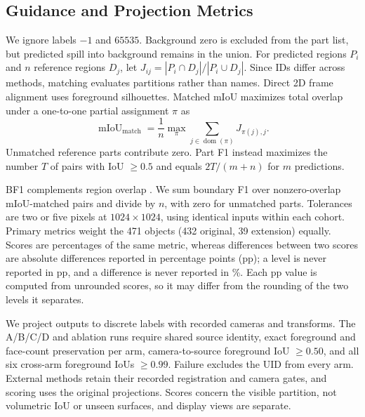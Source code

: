 \documentclass[pdflatex,sn-mathphys-ay]{sn-jnl}
\begin{document}
\subsection{Guidance and Projection Metrics}
We ignore labels $-1$ and $65535$. Background zero is excluded from the part list, but predicted spill into background remains in the union. For predicted regions $P_i$ and $n$ reference regions $D_j$, let $J_{ij}=|P_i\cap D_j|/|P_i\cup D_j|$. Since IDs differ across methods, matching evaluates partitions rather than names. Direct 2D frame alignment uses foreground silhouettes. Matched mIoU maximizes total overlap under a one-to-one partial assignment $\pi$ as
\begin{equation}
\operatorname{mIoU}_{\mathrm{match}}
=\frac1n\max_\pi\sum_{j\in\operatorname{dom}(\pi)}J_{\pi(j),j}.
\label{eq:matched}
\end{equation}
Unmatched reference parts contribute zero. Part F1 instead maximizes the number $T$ of pairs with IoU $\geq0.5$ and equals $2T/(m+n)$ for $m$ predictions.

BF1 complements region overlap \citep{cheng2021boundaryiou}. We sum boundary F1 over nonzero-overlap mIoU-matched pairs and divide by $n$, with zero for unmatched parts. Tolerances are two or five pixels at $1024\times1024$, using identical inputs within each cohort. Primary metrics weight the 471 objects (432 original, 39 extension) equally. Scores are percentages of the same metric, whereas differences between two scores are absolute differences reported in percentage points (pp); a level is never reported in pp, and a difference is never reported in \%. Each pp value is computed from unrounded scores, so it may differ from the rounding of the two levels it separates.

We project outputs to discrete labels with recorded cameras and transforms. The A/B/C/D and ablation runs require shared source identity, exact foreground and face-count preservation per arm, camera-to-source foreground IoU $\geq0.50$, and all six cross-arm foreground IoUs $\geq0.99$. Failure excludes the UID from every arm. External methods retain their recorded registration and camera gates, and scoring uses the original projections. Scores concern the visible partition, not volumetric IoU or unseen surfaces, and display views are separate.
\end{document}
